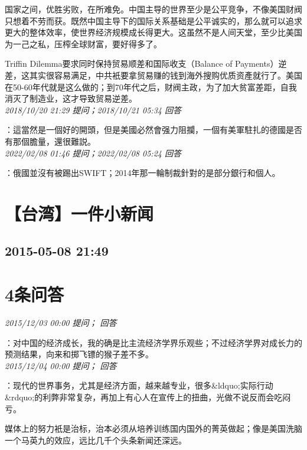\documentclass[twocolumn]{ctexart}
\begin{document}
国家之间，优胜劣败，在所难免。中国主导的世界至少是公平竞争，不像美国财阀只想着不劳而获。既然中国主导下的国际关系基础是公平诚实的，那么就可以追求更大的整体效率，使世界经济规模成长得更大。这虽然不是人间天堂，至少比美国为一己之私，压榨全球财富，要好得多了。

Triffin Dilemma要求同时保持贸易顺差和国际收支（Balance of Payments）逆差，这其实很容易满足，中共衹要拿贸易赚的钱到海外搜购优质资產就行了。美国在50-60年代就是这么做的；到70年代之后，财阀主政，为了加大贫富差距，自我消灭了制造业，这才导致贸易逆差。\\

\textit{\hfill\noindent\small 2018/10/20 21:29 提问；2018/10/21 05:34 回答}

：這當然是一個好的開頭，但是美國必然會强力阻攔，一個有美軍駐扎的德國是否有那個膽量，還很難説。
\\

\textit{\hfill\noindent\small 2022/02/08 01:46 提问；2022/02/08 05:24 回答}

：俄國並沒有被踢出SWIFT；2014年那一輪制裁針對的是部分銀行和個人。
\\


\section{【台湾】一件小新闻}
\subsection{2015-05-08 21:49}


\section{4条问答}

\textit{\hfill\noindent\small 2015/12/03 00:00 提问； 回答}

：对中国的经济成长，我的确是比主流经济学界乐观些；不过经济学界对成长力的预测结果，向来和掷飞镖的猴子差不多。\\

\textit{\hfill\noindent\small 2015/12/04 00:00 提问； 回答}

：现代的世界事务，尤其是经济方面，越来越专业，很多\&ldquo;实际行动\&rdquo;的利弊非常复杂，再加上有心人在宣传上的扭曲，光做不说反而会吃闷亏。

媒体上的努力衹是治标，治本必须从培养训练国内国外的菁英做起；像是美国洗脑一个马英九的效应，远比几千个头条新闻还深远。\\
\end{document}
